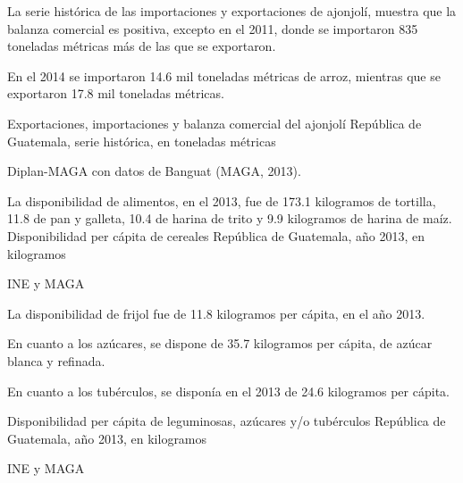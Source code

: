 %
{%
	La serie histórica de las importaciones y exportaciones de ajonjolí, muestra que la balanza comercial es positiva, excepto en el 2011, donde se importaron 835 toneladas métricas más de las que se exportaron.
	
	En el 2014 se importaron 14.6 mil toneladas métricas de arroz, mientras que se exportaron 17.8 mil toneladas métricas. 
}%
{%
	Exportaciones, importaciones y balanza comercial del ajonjolí} %
{%
	República de Guatemala, serie histórica, en toneladas métricas } %
{%
	\begin{tikzpicture}[x=1pt,y=1pt]    \end{tikzpicture}}%
{%
	Diplan-MAGA con datos de Banguat (MAGA, 2013).} %


%
{%
La disponibilidad de alimentos, en el 2013, fue de 173.1 kilogramos de tortilla, 11.8 de pan y galleta, 10.4 de harina de trito y 9.9 kilogramos de harina de maíz.}%
{%
	Disponibilidad per cápita de cereales} %
{%
	República de Guatemala, año 2013, en kilogramos } %
{%
	\begin{tikzpicture}[x=1pt,y=1pt]    \end{tikzpicture}}%
{%
	INE y MAGA} %


%
{%
La disponibilidad de frijol fue de 11.8 kilogramos per cápita, en el año 2013.

En cuanto a los azúcares, se dispone de 35.7 kilogramos per cápita, de azúcar blanca y refinada.

En cuanto a los tubérculos, se disponía en el 2013 de 24.6 kilogramos per cápita.}%
{%
	Disponibilidad per cápita de leguminosas, azúcares y/o tubérculos  } %
{%
	República de Guatemala, año 2013, en kilogramos } %
{%
	\begin{tikzpicture}[x=1pt,y=1pt]    \end{tikzpicture}}%
{%
	INE y MAGA} %



